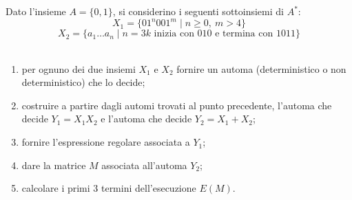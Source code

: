 \begin{ex}
Dato l'insieme $A=\{0,1\}$, si considerino i seguenti sottoinsiemi di $A^*$:
\[
X_1=\{01^n001^m\mid n\geq 0,\ m>4\}
\]
\[
X_2=\{a_1\dots a_n\mid n=3k \text{ inizia con } 010 \text{ e termina con } 1011\}
\]
\ \begin{enumerate}
    \item per ognuno dei due insiemi $X_1$ e $X_2$ fornire un automa (deterministico o non deterministico) che lo decide;
    \item costruire a partire dagli automi trovati al punto precedente, l'automa che decide $Y_1=X_1X_2$ e l'automa che decide $Y_2=X_1+X_2$;
    \item fornire l'espressione regolare associata a $Y_1$;
    \item dare la matrice $M$ associata all'automa $Y_2$;
    \item calcolare i primi $3$ termini dell'esecuzione $E(M)$.
\end{enumerate}
\end{ex}

